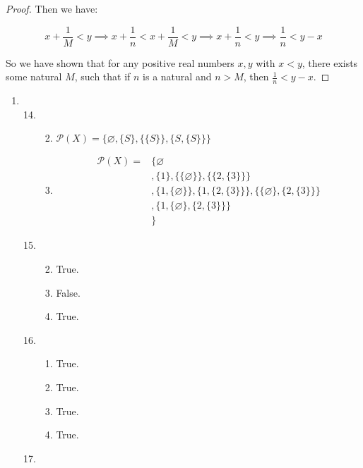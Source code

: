 \documentclass[12pt,letterpaper]{article}
\renewcommand{\labelenumi}{\S 1.\arabic*}
\begin{document}
\begin{enumerate}
\begin{enumerate}
\begin{enumerate}
\begin{proof}
                Then we have:

                \[
                  x + \frac{1}{M} < y \implies x + \frac{1}{n} < x + \frac{1}{M} < y \implies x + \frac{1}{n} < y \implies \frac{1}{n} < y - x
                \]

                So we have shown that for any positive real numbers $x, y$ with $x < y$,
                there exists some natural $M$,
                such that if $n$ is a natural and $n > M$, then $\frac{1}{n} < y - x$.
              \end{proof}
          \end{enumerate}
      \end{enumerate}
  \end{enumerate}
  \renewcommand{\labelenumi}{\S 2.\arabic*}
  \begin{enumerate}
    \item
      \begin{enumerate}
        \setcounter{enumii}{13}
        \item
          \begin{enumerate}
            \setcounter{enumiii}{1}
            \item $\mathcal{P}(X) = \{\varnothing, \{S\}, \{\{S\}\}, \{S, \{S\}\}\}$
            \setcounter{enumiii}{3}
            \item
              \begin{align*}
                \mathcal{P}(X) =
                &\{ \varnothing \\
                &, \{1\}, \{\{\varnothing\}\}, \{\{2, \{3\}\}\} \\
                &, \{1, \{\varnothing\}\}, \{1, \{2, \{3\}\}\}, \{\{\varnothing\}, \{2, \{3\}\}\} \\
                &, \{1, \{\varnothing\}, \{2, \{3\}\}\} \\
                &\}
              \end{align*}
          \end{enumerate}
        \item
          \begin{enumerate}
            \setcounter{enumiii}{1}
            \item True.
            \item False.
            \item True.
          \end{enumerate}
        \setcounter{enumii}{16}
        \item
          \begin{enumerate}
            \item True.
            \item True.
            \setcounter{enumiii}{3}
            \item True.
            \setcounter{enumiii}{5}
            \item True.
          \end{enumerate}
        \item


\end{enumerate}
\end{enumerate}
\end{document}
